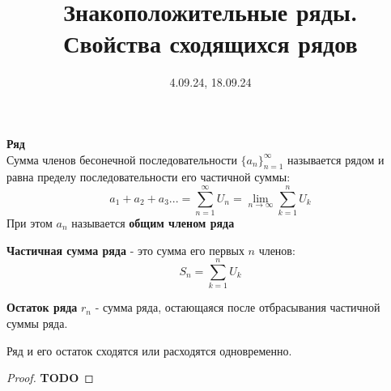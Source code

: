 

\date{4.09.24, 18.09.24}
\title{Знакоположительные ряды. \\Свойства сходящихся рядов}

\maketitle

\begin{opr}
    \textbf{Ряд}\\
    Сумма членов бесонечной последовательности
    \(\{a_{n}\}^{\infty}_{n=1}\) называется рядом
    и равна пределу последовательности 
    его частичной суммы:
    \begin{equation}
        a_{1} + a_{2} + a_{3} ... 
        = \sum_{n=1}^{\infty} U_{n}
        = \lim_{n\to\infty}\sum_{k=1}^{n} U_{k}
    \end{equation}
    При этом \(a_{n}\) называется \textbf{общим членом ряда}
\end{opr}

\begin{opr}
    \textbf{Частичная сумма ряда} - это сумма его первых \(n\) членов:
    \begin{equation}
        S_{n} = \sum_{k = 1}^{n} U_{k}
    \end{equation}
\end{opr}

\begin{opr}
    \textbf{Остаток ряда} \(r_{n}\) - сумма ряда, остающаяся
    после отбрасывания частичной суммы ряда.
\end{opr}

\begin{remark}
    Ряд и его остаток сходятся или расходятся одновременно.
    \begin{proof}
        \color{YellowOrange}\textbf{TODO}
    \end{proof}
\end{remark}

